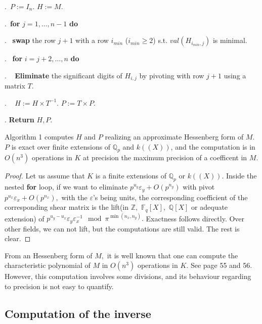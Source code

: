 \documentclass{sig-alternate-05-2015}
\begin{document}
.\ $P:=I_n.$ \: $H:=M.$


.\ {\bf for} $j=1,\dots,n-1$ {\bf do} 

.\  \:  {\bf swap} the row $j+1$ with a row $i_{min}$ ($i_{min} \geq 2$) s.t. $val(H_{i_{min},j})$ is minimal. 

.\  \:  {\bf for} $i=j+2,\dots,n$ {\bf do} 

. \ \: \:  \textbf{Eliminate} the significant digits of $H_{i,j}$ by pivoting with row $j+1$ 
using a matrix $T.$

. \ \: \:  $H:=H \times T^{-1}.$ \: $P:=T \times P.$

. \textbf{Return} $H,P.$

\vspace{-1ex}\noindent\hrulefill

\medskip



\begin{prop} 
Algorithm 1 computes $H$ and $P$ realizing an approximate Hessenberg form of $M.$
$P$ is exact over finite extensions of $\mathbb{Q}_p$ and $k((X))$, and the computation is in $O(n^3)$ operations in $K$ at precision the maximum precision of a coefficent in $M.$
\end{prop}
\begin{proof}
Let us assume that $K$ is a finite extensions of $\mathbb{Q}_p$ or $k((X)).$
Inside the nested \textbf{for} loop, if we want to eliminate $p^{u_y} \varepsilon_y+O(p^{n_y})$ with pivot $p^{u_x} \varepsilon_x+O(p^{n_x}),$
with the $\varepsilon$'s being units,
the corresponding coefficient of the corresponding shear matrix is the lift(in $\mathbb{Z}, $  $\mathbb{F}_q[X],$ $\mathbb{Q}[X]$ or adequate extension) of $p^{u_y-u_x} \varepsilon_y \varepsilon_x^{-1} \mod \pi^{\min (n_x,n_y)}.$
Exactness follows directly. Over other fields, we can not lift, but the computations are still valid.
The rest is clear.
\end{proof}

\begin{rem} \label{rem:char_pol_from_hessenberg}
From an Hessenberg form of $M,$ it is well known
that one can compute the characteristic polynomial of 
$M$ in $O(n^3)$ operations in $K.$ See \cite{Cohen:2013} page
55 and 56.
However, this computation involves some divisions, and its
behaviour regarding to precision is not easy to
quantify.
\end{rem}


\subsection{Computation of the inverse}
\end{document}
